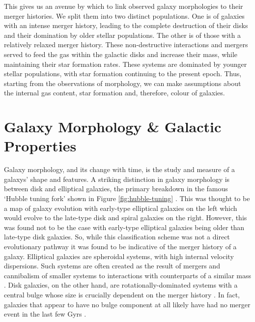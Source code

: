 This gives us an avenue by which to link observed galaxy morphologies to their merger histories. We split them into two distinct populations. One is of galaxies with an intense merger history, leading to the complete destruction of their disks and their domination by older stellar populations. The other is of those with a relatively relaxed merger history. These non-destructive interactions and mergers served to feed the gas within the galactic disks and increase their mass, while maintaining their star formation rates. These systems are dominated by younger stellar populations, with star formation continuing to the present epoch. Thus, starting from the observations of morphology, we can make assumptions about the internal gas content, star formation and, therefore, colour of galaxies.

\section{Galaxy Morphology \& Galactic Properties}\label{galaxy-morphology}
\noindent Galaxy morphology, and its change with time, is the study and measure of a galaxys' shape and features. A striking distinction in galaxy morphology is between disk and elliptical galaxies, the primary breakdown in the famous `Hubble tuning fork' shown in Figure \ref{fig:hubble-tuning} \citep{1936rene.book.....H}. This was thought to be a map of galaxy evolution with early-type elliptical galaxies on the left which would evolve to the late-type disk and spiral galaxies on the right. However, this was found not to be the case with early-type elliptical galaxies being older than late-type disk galaxies. So, while this classification scheme was not a direct evolutionary pathway it was found to be indicative of the merger history of a galaxy. Elliptical galaxies are spheroidal systems, with high internal velocity dispersions. Such systems are often created as the result of mergers and cannibalism of smaller systems to interactions with counterparts of a similar mass \citep{1996MNRAS.283.1361B, 2006MNRAS.366..499D}. Disk galaxies, on the other hand, are rotationally-dominated systems with a central bulge whose size is crucially dependent on the merger history \citep{1992ApJ...393..484B, 2010ApJ...715..202H, 2017ApJ...837L...8B}. In fact, galaxies that appear to have no bulge component at all likely have had no merger event in the last few Gyrs \citep{2012ApJ...756...26M}.

